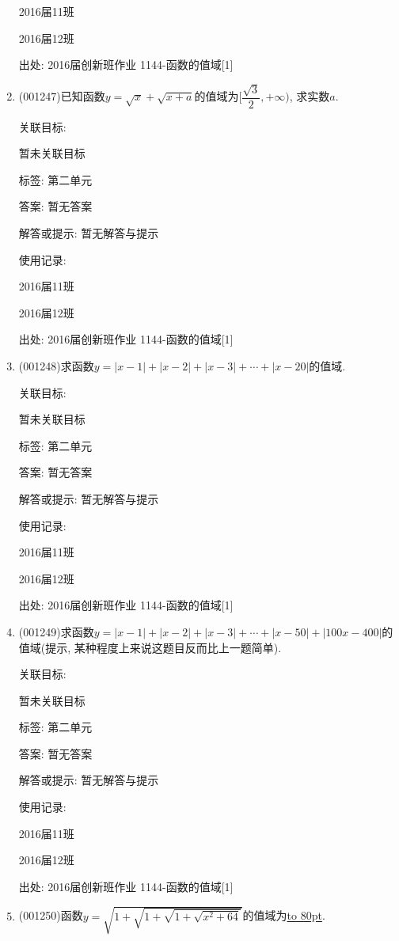 \documentclass[10pt,a4paper]{article}
\newcommand{\blank}[1]{\underline{\hbox to #1pt{}}}
\begin{document}
\begin{enumerate}[1.]
2016届11班	

2016届12班	


出处: 2016届创新班作业	1144-函数的值域[1]
\item { (001247)}已知函数$y=\sqrt{x}+\sqrt{x+a}$的值域为$[\dfrac{\sqrt{3}}{2},+\infty)$, 求实数$a$.


关联目标:

暂未关联目标



标签: 第二单元

答案: 暂无答案

解答或提示: 暂无解答与提示

使用记录:

2016届11班	

2016届12班	


出处: 2016届创新班作业	1144-函数的值域[1]
\item { (001248)}求函数$y=|x-1|+|x-2|+|x-3|+\cdots+|x-20|$的值域.


关联目标:

暂未关联目标



标签: 第二单元

答案: 暂无答案

解答或提示: 暂无解答与提示

使用记录:

2016届11班	

2016届12班	


出处: 2016届创新班作业	1144-函数的值域[1]
\item { (001249)}求函数$y=|x-1|+|x-2|+|x-3|+\cdots+|x-50|+|100x-400|$的值域(提示, 某种程度上来说这题目反而比上一题简单).


关联目标:

暂未关联目标



标签: 第二单元

答案: 暂无答案

解答或提示: 暂无解答与提示

使用记录:

2016届11班	

2016届12班	


出处: 2016届创新班作业	1144-函数的值域[1]
\item { (001250)}函数$y=\sqrt{1+\sqrt{1+\sqrt{1+\sqrt{x^2+64}}}}$的值域为\blank{80}.



\end{enumerate}
\end{document}
